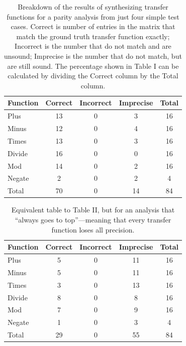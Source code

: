 \documentclass[10pt,conference]{IEEEtran}
\begin{document}
\begin{table}
\centering
 \begin{tabular}{l c c c c }
  
  Function & Correct & Incorrect & Imprecise & Total\\ 
  \midrule
  Plus & 13 & 0 & 3 & 16 \\
  Minus & 12 & 0 & 4 & 16 \\
  Times & 13 & 0 & 3 & 16 \\
  Divide & 16 & 0 & 0 & 16 \\
  Mod & 14 & 0 & 2 & 16 \\
  Negate & 2 & 0 & 2 & 4 \\
  \midrule
  Total & 70 & 0 & 14 & 84 \\
 \end{tabular}
 \caption{Breakdown of the results of synthesizing transfer functions
 for a parity analysis from just four simple test cases. Correct is number
 of entries in the matrix that match the ground truth transfer function
 exactly; Incorrect is the number that do not match and are unsound;
 Imprecise is the number that do not match, but are still sound. The
 percentage shown in Table I can be calculated by dividing
 the Correct column by the Total column.}
 \label{tab-parity0}
\end{table}

\begin{table}
\centering
 \begin{tabular}{l c c c c }
  
  Function & Correct & Incorrect & Imprecise & Total\\ 
  \midrule
  Plus & 5 & 0 & 11 & 16 \\
  Minus & 5 & 0 & 11 & 16 \\
  Times & 3 & 0 & 13 & 16 \\
  Divide & 8 & 0 & 8 & 16 \\
  Mod & 7 & 0 & 9 & 16 \\
  Negate & 1 & 0 & 3 & 4 \\
  \midrule
  Total & 29 & 0 & 55 & 84 \\
 \end{tabular}
 \caption{Equivalent table to Table II, but for an
 analysis that ``always goes to top''---meaning that every
 transfer function loses all precision.}
 \label{tab-top}
\end{table}
\end{document}
